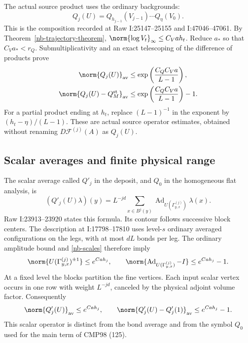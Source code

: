 The actual source product uses the ordinary backgrounds:
\begin{equation}\label{nb-actual-product}
 Q_j(U)=Q_{h_{j-1}}(V_{j-1})\cdots Q_\eta(V_0).
\end{equation}
This is the composition recorded at Raw I:25147--25155 and
I:47046--47061. By Theorem~\ref{nb-trajectory-theorem},
$\norm{\log V_t}_\infty\le C_Vah_t$. Reduce $a_*$ so that
$C_Va_*<r_Q$. Submultiplicativity and an exact telescoping
of the difference of products prove
\begin{align}
 \norm{Q_j(U)}_{\rm av}
       &\le\exp\left(\frac{C_QC_Va}{L-1}\right),
                                      \label{nb-product-bound}\\
 \norm{Q_j(U)-Q_M^{\rm st}}_{\rm av}
       &\le\exp\left(\frac{C_QC_Va}{L-1}\right)-1.
                                      \label{nb-product-difference}
\end{align}
For a partial product ending at $h_t$, replace $(L-1)^{-1}$
in the exponent by $(h_t-\eta)/(L-1)$. These are actual source
operator estimates, obtained without renaming
$D\mathcal F^{(j)}(A)$ as $Q_j(U)$.

\subsection{Scalar averages and finite physical range}

The scalar average called $Q'_j$ in the deposit, and $Q_0$
in the homogeneous flat analysis, is
\begin{equation}\label{nb-scalar-average}
 (Q'_j(U)\lambda)(y)=L^{-jd}\sum_{x\in B^j(y)}
       \operatorname{Ad}_{U(\Gamma^{(j)}_{y,x})}\lambda(x).
\end{equation}
Raw I:23913--23920 states this formula. Its contour follows
successive block centers. The description at I:17798--17810
uses level-$s$ ordinary averaged configurations on the legs,
with at most $dL$ bonds per leg. The ordinary amplitude bound
and \eqref{nb-scales} therefore imply
\begin{equation}\label{nb-scalar-transport}
 \norm{U(\Gamma^{(j)}_{y,x})^{\pm1}}\le e^{Cah_j},
 \qquad
 \norm{\operatorname{Ad}_{U(\Gamma^{(j)}_{y,x})}-I}
                                      \le e^{Cah_j}-1.
\end{equation}
At a fixed level the blocks partition the fine vertices.
Each input scalar vertex occurs in one row with weight
$L^{-jd}$, canceled by the physical adjoint volume factor.
Consequently
\begin{equation}\label{nb-scalar-difference}
 \norm{Q'_j(U)}_{\rm av}\le e^{Cah_j},\qquad
 \norm{Q'_j(U)-Q'_j(1)}_{\rm av}\le e^{Cah_j}-1.
\end{equation}
This scalar operator is distinct from the bond average and
from the symbol $Q_0$ used for the main term of CMP98 (125).


